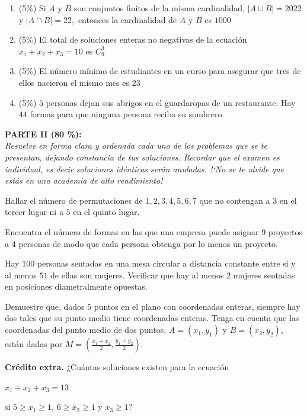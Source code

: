 \documentclass[12pt]{article}
\begin{document}
  \begin{enumerate}

\item (5\%) Si $A$ y $B$ son conjuntos finitos de la misma cardinalidad, $|A\cup B| = 2022$ y $|A \cap B| = 22,$
entonces la cardinalidad de $A$ y $B$ es $1000$\dotfill{\bf \rule{1.5cm}{0.7pt}}
\item (5\%) El total de soluciones enteras no negativas de la ecuaci\'on $x_1+x_2+x_3=10$ es $\displaystyle C^3_9$\dotfill{\bf \rule{1.5cm}{0.7pt}}
\item (5\%) El número mínimo de estudiantes en un curso para asegurar que tres de ellos nacieron el mismo
mes es $23$\dotfill{\bf \rule{1.5cm}{0.7pt}}
\item (5\%) $5$ personas dejan sus abrigos en el guardaropas de un restaurante. Hay $44$ formas para que
ninguna persona reciba su sombrero.\dotfill{\bf \rule{1.5cm}{0.7pt}}
 
\end{enumerate}


{\bf PARTE II (80 \%):}\\
\textit{Resuelve en forma clara y ordenada cada uno de los problemas que se te 
presentan, dejando constancia de tus soluciones. Recordar que el examen es individual, es decir soluciones id\'enticas ser\'an anuladas. !`No se te olvide que est\'as 
en una academia de alto rendimiento!}


\begin{problema}
    Hallar el número de permutaciones de $1,2,3,4,5,6,7$ que no contengan a $3$ en el tercer lugar ni a $5$ en el quinto lugar.
\end{problema}

\begin{problema}
    Encuentra el número de formas en las que una empresa puede asignar $9$ proyectos a $4$ personas de modo que cada persona obtenga por lo menos un proyecto.
\end{problema}

\begin{problema}
    Hay $100$ personas sentadas en una mesa circular a distancia constante entre sí y al menos $51$ de ellas son mujeres. Verificar que hay al menos $2$ mujeres sentadas en posiciones diametralmente opuestas.
\end{problema}

\begin{problema}
    Demuestre que, dados $5$ puntos en el plano con coordenadas enteras, siempre hay dos tales que su punto medio tiene coordenadas enteras. Tenga en cuenta que las coordenadas del punto medio de dos puntos, $A=(x_1,y_1)$ y $B=(x_2,y_2)$, están dadas por $\displaystyle M=\left(\frac{x_1 + x_2}{2}, \frac{y_1 + y_2}{2}\right)$.
\end{problema}

\textbf{Crédito extra.} ¿Cuántas soluciones existen para la ecuación

\begin{center}
    $x_1+x_2+x_3 = 13$
\end{center}

si $5 \geq x_1 \geq 1$, $6 \geq x_2 \geq 1$ y $x_3 \geq 1$?
\end{document}
